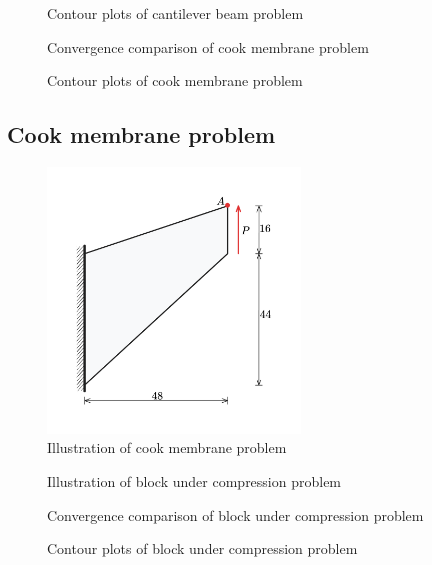\begin{figure}[!ht]
\centering
\caption{Contour plots of cantilever beam problem}\label{plate_with_hole_contour}
\end{figure}
\begin{figure}[!ht]
\centering
\caption{Convergence comparison of cook membrane problem}\label{cook_convergence}
\end{figure}

\begin{figure}[!ht]
\centering
\caption{Contour plots of cook membrane problem}\label{cook_contour}
\end{figure}

\subsection{Cook membrane problem}

\begin{figure}[!ht]
\centering
\includegraphics[width=0.6\textwidth]{png/cook_membrane_model.png}
\caption{Illustration of cook membrane problem}\label{cook_illsutration}
\end{figure}


\begin{figure}[!ht]
\centering
\caption{Illustration of block under compression problem}\label{block_illsutration}
\end{figure}

\begin{figure}[!ht]
\centering
\caption{Convergence comparison of block under compression problem}\label{block_convergence}
\end{figure}

\begin{figure}[!ht]
\centering
\caption{Contour plots of block under compression problem}\label{block_contour}
\end{figure}
